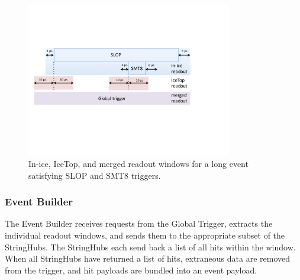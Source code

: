 \begin{figure}[!ht]
 \centering
 \includegraphics[width=0.8\textwidth]{graphics/online/trigger/trigger_readout}
 \caption{In-ice, IceTop, and merged readout windows for a long event
   satisfying SLOP and SMT8 triggers.}
 \label{fig:trigger_readout}
\end{figure}


\subsubsection{\label{sect:online:evbuilder}Event Builder}

The Event Builder receives requests from the Global Trigger, extracts the
individual readout windows, and sends them to the appropriate subset of the
StringHubs.  The StringHubs each send back a list of all hits within the
window.  When all StringHubs have returned a list of hits, extraneous data are
removed from the trigger, and hit payloads are bundled into an event payload.

